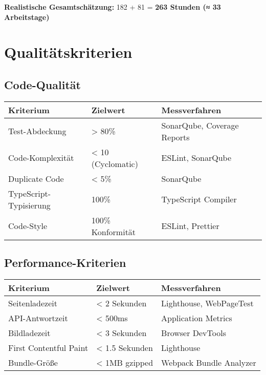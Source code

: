 \documentclass[a4paper,12pt]{article}
\begin{document}
\textbf{Realistische Gesamtschätzung:} 182 + 81 = \textbf{263 Stunden (≈ 33 Arbeitstage)}

\section{Qualitätskriterien}

\subsection{Code-Qualität}
\begin{longtable}{|p{}|p{}|p{}|}
\hline
\textbf{Kriterium} & \textbf{Zielwert} & \textbf{Messverfahren} \\
\hline
Test-Abdeckung & > 80\% & SonarQube, Coverage Reports \\
\hline
Code-Komplexität & < 10 (Cyclomatic) & ESLint, SonarQube \\
\hline
Duplicate Code & < 5\% & SonarQube \\
\hline
TypeScript-Typisierung & 100\% & TypeScript Compiler \\
\hline
Code-Style & 100\% Konformität & ESLint, Prettier \\
\hline
\end{longtable}

\subsection{Performance-Kriterien}
\begin{longtable}{|p{}|p{}|p{}|}
\hline
\textbf{Kriterium} & \textbf{Zielwert} & \textbf{Messverfahren} \\
\hline
Seitenladezeit & < 2 Sekunden & Lighthouse, WebPageTest \\
\hline
API-Antwortzeit & < 500ms & Application Metrics \\
\hline
Bildladezeit & < 3 Sekunden & Browser DevTools \\
\hline
First Contentful Paint & < 1.5 Sekunden & Lighthouse \\
\hline
Bundle-Größe & < 1MB gzipped & Webpack Bundle Analyzer \\
\hline
\end{longtable}
\end{document}
